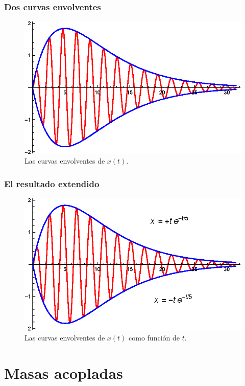 \begin{frame}
\frametitle{Dos curvas envolventes}
\begin{figure}
    \centering
    \includegraphics[scale=1]{Imagenes/Ejemplo_Resonancia_04.eps}
    \caption{Las curvas envolventes de $x(t)$.}
\end{figure}
\end{frame}
\begin{frame}
\frametitle{El resultado extendido}
\begin{figure}
    \centering
    \includegraphics[scale=1]{Imagenes/Ejemplo_Resonancia_05.eps}
    \caption{Las curvas envolventes de $x(t)$ como función de $t$.}
\end{figure}
\end{frame}
\section{Masas acopladas}
